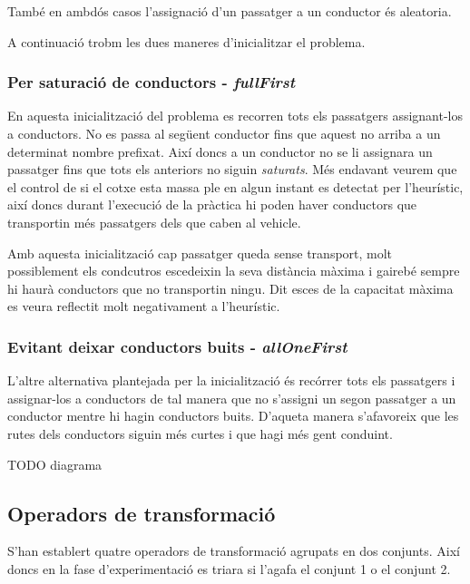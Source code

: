 També en ambdós casos l'assignació d'un passatger a un conductor és aleatoria.

A continuació trobm les dues maneres d'inicialitzar el problema.

\subsubsection{Per saturació de conductors - \emph{fullFirst}}
En aquesta inicialització del problema es recorren tots els passatgers assignant-los a conductors. No es passa
al següent conductor fins que aquest no arriba a un determinat nombre prefixat. Així doncs a un conductor no se
li assignara un passatger fins que tots els anteriors no siguin \emph{saturats}. Més endavant veurem
que el control de si el cotxe esta massa ple en algun instant es detectat per l'heurístic, així doncs
durant l'execució de la pràctica hi poden haver conductors que transportin més passatgers dels que
caben al vehicle.



Amb aquesta inicialització cap passatger queda sense transport, molt possiblement els condcutros escedeixin
la seva distància màxima i gairebé sempre hi haurà conductors que no transportin ningu.
Dit esces de la capacitat màxima es veura reflectit molt negativament a l'heurístic.


\subsubsection{Evitant deixar conductors buits - \emph{allOneFirst}}
L'altre alternativa plantejada per la inicialització és recórrer tots els passatgers i assignar-los a conductors
de tal manera que no s'assigni un segon passatger a un conductor mentre hi hagin conductors buits.
D'aqueta manera s'afavoreix que les rutes dels conductors siguin més curtes i que hagi més
gent conduint.

TODO diagrama

\subsection{Operadors de transformació}
S'han establert quatre operadors de transformació agrupats en dos conjunts. Així doncs en la fase d'experimentació
es triara si l'agafa el conjunt 1 o el conjunt 2.

